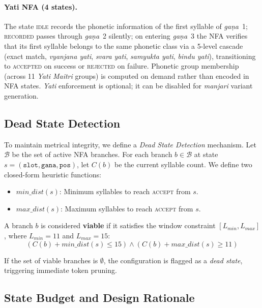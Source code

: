 \documentclass[11pt]{article}
\begin{document}
\paragraph{Yati NFA (4 states).}
The state \textsc{idle} records the phonetic information of the first syllable of \textit{ga\d{n}a}~1; \textsc{recorded} passes through \textit{ga\d{n}a}~2 silently; on entering \textit{ga\d{n}a}~3 the NFA verifies that its first syllable belongs to the same phonetic class via a 5-level cascade (exact match, \textit{vyanjana yati}, \textit{svara yati}, \textit{samyukta yati}, \textit{bindu yati}), transitioning to \textsc{accepted} on success or \textsc{rejected} on failure. Phonetic group membership (across 11 \textit{Yati Maitri} groups) is computed on demand rather than encoded in NFA states. \textit{Yati} enforcement is optional; it can be disabled
for \textit{manjari} variant generation.

\subsection{Dead State Detection}

To maintain metrical integrity, we define a \textit{Dead State Detection} mechanism. Let $\mathcal{B}$ be the set of active NFA branches. For each branch $b \in \mathcal{B}$ at state $s = (\texttt{slot}, \texttt{gana}, \texttt{pos})$, let $C(b)$ be the current syllable count. We define two closed-form heuristic functions:
\begin{itemize}
    \item $min\_dist(s)$: Minimum syllables to reach \textsc{accept} from $s$.
    \item $max\_dist(s)$: Maximum syllables to reach \textsc{accept} from $s$.
\end{itemize}

A branch $b$ is considered \textbf{viable} if it satisfies the window constraint $[L_{min}, L_{max}]$, where $L_{min}=11$ and $L_{max}=15$:
\begin{equation}
    (C(b) + \textit{min\_dist}(s) \le 15) \land (C(b) + \textit{max\_dist}(s) \ge 11)
\end{equation}

If the set of viable branches is $\emptyset$, the configuration is flagged as a \textit{dead state}, triggering immediate token pruning.

\subsection{State Budget and Design Rationale}
\end{document}
